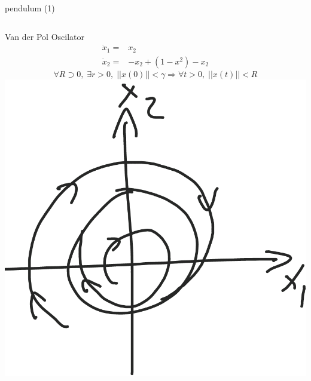 \documentclass{beamer}
\begin{document}
\begin{frame}{pendulum (1)}
    \begin{columns}[T]
    Van der Pol Oscilator
    \begin{align*}
        \dot{x}_1 =& x_2\\
        \dot{x}_2 =& -x_2+(1-x^2)-x_2
    \end{align*}
    \vspace{1cm}
    $$\forall R\supset 0,\; \exists r>0,\; ||x(0)||<\gamma \Rightarrow \forall t>0,\;||x(t)||<R$$
        \vspace{-1cm}
        \includegraphics[width=\textwidth]{fig/limitCircle.png}   
    \end{columns}
\end{frame}
\end{document}
